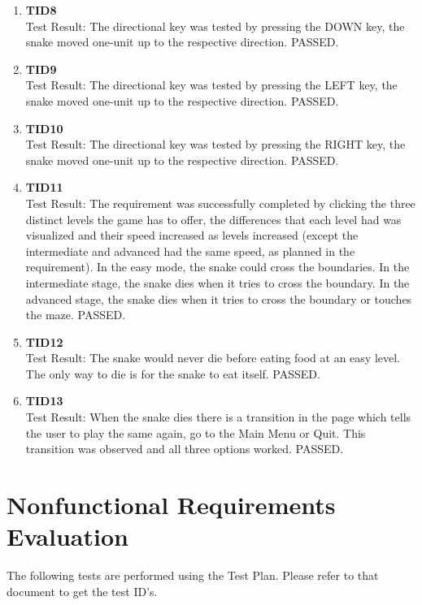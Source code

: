 \documentclass[12pt, titlepage]{article}
\begin{document}
\begin{enumerate}
	\item{\textbf{TID8}\\}
	Test Result:
	The directional key was tested by pressing the DOWN key, the snake moved one-unit up to the respective direction. PASSED.

	\item{\textbf{TID9}\\}
	Test Result:
	The directional key was tested by pressing the LEFT key, the snake moved one-unit up to the respective direction. PASSED.

	\item{\textbf{TID10}\\}
	Test Result:
	The directional key was tested by pressing the RIGHT key, the snake moved one-unit up to the respective direction. PASSED.

	\item{\textbf{TID11}\\}
	Test Result:
	The requirement was successfully completed by clicking the three distinct levels the game has to offer, the differences that each level had was visualized and their speed increased as levels increased (except the intermediate and advanced had the same speed, as planned in the requirement). In the easy mode, the snake could cross the boundaries. In the intermediate stage, the snake dies when it tries to cross the boundary. In the advanced stage, the snake dies when it tries to cross the boundary or touches the maze. PASSED.

	\item{\textbf{TID12}\\}
	Test Result:
	The snake would never die before eating food at an easy level. The only way to die is for the snake to eat itself. PASSED.

	\item{\textbf{TID13}\\}
	Test Result:
	When the snake dies there is a transition in the page which tells the user to play the same again, go to the Main Menu or Quit. This transition was observed and all three options worked. PASSED.



\end{enumerate}
\section{Nonfunctional Requirements Evaluation}

The following tests are performed using the Test Plan. Please refer to that document to get the test ID's.
\end{document}
